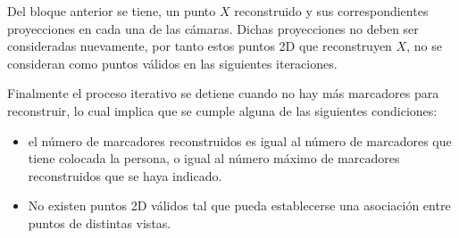 Del bloque anterior se tiene, un punto $X$ reconstruido y sus correspondientes proyecciones en cada una de las cámaras. Dichas proyecciones no deben ser consideradas nuevamente, por tanto estos puntos 2D que reconstruyen $X$, no se consideran como puntos válidos en las siguientes iteraciones.


Finalmente el proceso iterativo se detiene cuando no hay más marcadores para reconstruir, lo cual implica que se cumple alguna de las siguientes condiciones:
\begin{itemize}
\item el número de marcadores reconstruidos es igual al número de marcadores que tiene colocada la persona, o igual al número máximo de marcadores  reconstruidos que se haya indicado.

\item No existen puntos 2D válidos tal que pueda establecerse una asociación entre puntos de distintas vistas.
\end{itemize}





